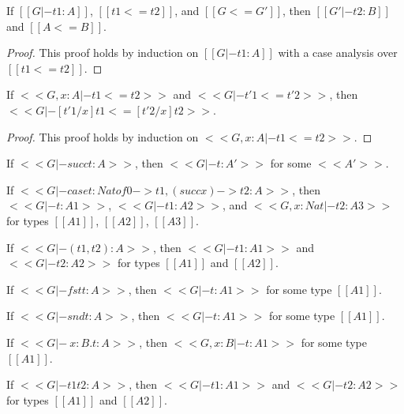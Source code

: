 \begin{lemma}
  \label{lemma:typing_for_type_precision}
  If $[[G |- t1 : A]]$, $[[t1 <= t2]]$, and $[[G <= G']]$, then $[[G' |- t2 : B]]$ and $[[A <= B]]$.
\end{lemma}
\begin{proof}
  This proof holds by induction on $[[G |- t1 : A]]$ with a case analysis over $[[t1 <= t2]]$.
\end{proof}

\begin{lemma}
  \label{lemma:substitution_for_term_precision}
  If $<<G, x : A |- t1 <= t2>>$ and $<<G |- t'1 <= t'2>>$, then $<<G |- [t'1/x]t1 <= [t'2/x]t2>>$.  
\end{lemma}
\begin{proof}
  This proof holds by induction on $<<G, x : A |- t1 <= t2>>$.
\end{proof}

\begin{lemma}
  \label{lemma:typeability_inversion}
  \begin{enumR}\small
  \item[] 
  \item If $<<G |- succ t : A>>$, then $<<G |- t : A'>>$ for some $<<A'>>$.
  \item If $<<G |- case t : Nat of 0 -> t1, (succ x) -> t2 : A>>$, then $<<G |- t : A1>>$, $<<G |- t1 : A2>>$,
    and $<<G,x : Nat |- t2 : A3>>$ for types $[[A1]]$, $[[A2]]$, $[[A3]]$.
  \item If $<<G |- (t1, t2) : A>>$, then $<<G |- t1 : A1>>$ and  $<<G |- t2 : A2>>$ for types $[[A1]]$ and $[[A2]]$.
  \item If $<<G |- fst t : A>>$, then $<<G |- t : A1>>$ for some type $[[A1]]$.
  \item If $<<G |- snd t : A>>$, then $<<G |- t : A1>>$ for some type $[[A1]]$.    
  \item If $<<G |- \ x : B . t : A>>$, then $<<G, x : B |- t : A1>>$ for some type $[[A1]]$.
  \item If $<<G |- t1 t2 : A>>$, then $<<G |- t1 : A1>>$ and  $<<G |- t2 : A2>>$ for types $[[A1]]$ and $[[A2]]$.  
  \end{enumR}
\end{lemma}


